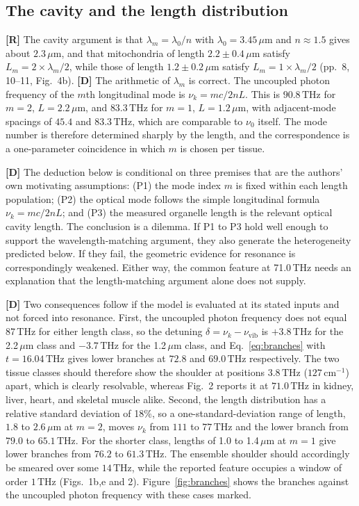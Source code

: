 \documentclass[11pt]{article}
\newcommand{\stR}{\textbf{\textcolor{blue!55!black}{[R]}}}
\newcommand{\stD}{\textbf{\textcolor{green!40!black}{[D]}}}
\newcommand{\thz}{\,\mathrm{THz}}
\newcommand{\cmi}{\,\mathrm{cm^{-1}}}
\theoremstyle{plain}
\theoremstyle{definition}
\theoremstyle{remark}
\begin{document}
\subsection{The cavity and the length distribution}

\stR{} The cavity argument is that $\lambda_m=\lambda_0/n$ with $\lambda_0=3.45\,\mu\mathrm{m}$ and $n\approx1.5$ gives about $2.3\,\mu\mathrm{m}$, and that mitochondria of length $2.2\pm0.4\,\mu\mathrm{m}$ satisfy $L_m=2\times\lambda_m/2$, while those of length $1.2\pm0.2\,\mu\mathrm{m}$ satisfy $L_m=1\times\lambda_m/2$ (pp.~8, 10--11, Fig.~4b). \stD{} The arithmetic of $\lambda_m$ is correct. The uncoupled photon frequency of the $m$th longitudinal mode is $\nu_k=mc/2nL$. This is $90.8\thz$ for $m=2$, $L=2.2\,\mu\mathrm{m}$, and $83.3\thz$ for $m=1$, $L=1.2\,\mu\mathrm{m}$, with adjacent-mode spacings of $45.4$ and $83.3\thz$, which are comparable to $\nu_0$ itself. The mode number is therefore determined sharply by the length, and the correspondence is a one-parameter coincidence in which $m$ is chosen per tissue.

\stD{} The deduction below is conditional on three premises that are the authors' own motivating assumptions: (P1) the mode index $m$ is fixed within each length population; (P2) the optical mode follows the simple longitudinal formula $\nu_k=mc/2nL$; and (P3) the measured organelle length is the relevant optical cavity length. The conclusion is a dilemma. If P1 to P3 hold well enough to support the wavelength-matching argument, they also generate the heterogeneity predicted below. If they fail, the geometric evidence for resonance is correspondingly weakened. Either way, the common feature at 71.0\,THz needs an explanation that the length-matching argument alone does not supply.

\stD{} Two consequences follow if the model is evaluated at its stated inputs and not forced into resonance. First, the uncoupled photon frequency does not equal 87\,THz for either length class, so the detuning $\delta=\nu_k-\nu_{\mathrm{vib}}$ is $+3.8\thz$ for the 2.2\,$\mu$m class and $-3.7\thz$ for the 1.2\,$\mu$m class, and Eq.~\eqref{eq:branches} with $t=16.04\thz$ gives lower branches at $72.8$ and $69.0\thz$ respectively. The two tissue classes should therefore show the shoulder at positions $3.8\thz$ ($127\cmi$) apart, which is clearly resolvable, whereas Fig.~2 reports it at $71.0\thz$ in kidney, liver, heart, and skeletal muscle alike. Second, the length distribution has a relative standard deviation of 18\%, so a one-standard-deviation range of length, $1.8$ to $2.6\,\mu\mathrm{m}$ at $m=2$, moves $\nu_k$ from $111$ to $77\thz$ and the lower branch from $79.0$ to $65.1\thz$. For the shorter class, lengths of 1.0 to 1.4\,$\mu$m at $m=1$ give lower branches from $76.2$ to $61.3\thz$. The ensemble shoulder should accordingly be smeared over some $14\thz$, while the reported feature occupies a window of order $1\thz$ (Figs.~1b,e and 2). Figure~\ref{fig:branches} shows the branches against the uncoupled photon frequency with these cases marked.
\end{document}
